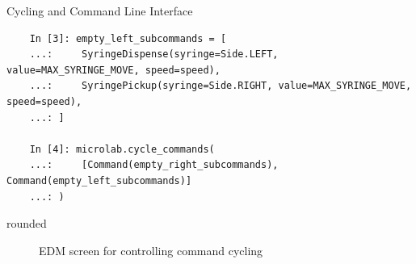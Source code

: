 \documentclass[a0paper,landscape]{baposter}
\begin{document}
\begin{poster}
\begin{posterbox}[name=cycling,column=1,span=2,below=implementation]{Cycling and Command Line Interface}
\begin{verbatim}
    In [3]: empty_left_subcommands = [
    ...:     SyringeDispense(syringe=Side.LEFT, value=MAX_SYRINGE_MOVE, speed=speed),
    ...:     SyringePickup(syringe=Side.RIGHT, value=MAX_SYRINGE_MOVE, speed=speed),
    ...: ]

    In [4]: microlab.cycle_commands(
    ...:     [Command(empty_right_subcommands), Command(empty_left_subcommands)]
    ...: )
    \end{verbatim}
\end{posterbox}
\begin{posterbox}[name=edmimage,column=3,headerfont={},headershape=rounded,boxheaderheight=0em,boxColorOne=white,borderColor=white]{rounded}
\begin{figure}[H]
\begin{center}
\caption{EDM screen for controlling command cycling}
\end{center}

\end{figure}
\end{posterbox}
\end{poster}
\end{document}
